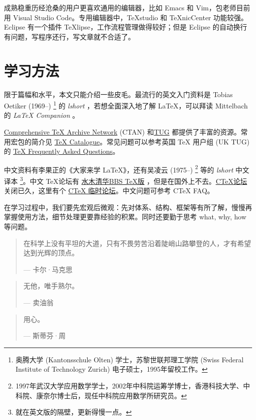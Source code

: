 成熟稳重历经沧桑的用户更喜欢通用的编辑器，比如 Emacs 和 Vim，包老师目前用 Visual Studio Code。专用编辑器中，TeXstudio 和 TeXnicCenter 功能较强。Eclipse 有一个插件 TeXlipse，工作流程管理做得较好；但是 Eclipse 的自动换行有问题，写程序还行，写文章就不合适了。

\section{学习方法}

限于篇幅和水平，本文只能介绍一些皮毛。最流行的英文入门资料是 Tobias Oetiker (1969--)\indexOetiker{} \footnote{奥腾大学 (Kantonsschule Olten) 学士，苏黎世联邦理工学院 (Swiss Federal Institute of Technology Zurich) 电子硕士，1995年留校工作。} 的 \emph{lshort} \citep{Oetiker_lshort}，若想全面深入地了解 \LaTeX ，可以拜读 Mittelbach 的 \emph{\LaTeX{} Companion} \citep{Mittelbach_latex_comp}。

\href{http://www.ctan.org/}{Comprehensive TeX Archive Network} (CTAN) 和\href{http://www.tug.org/}{TUG} 都提供了丰富的资源。常用宏包的简介见 \href{http://www.ctan.org/tex-archive/help/Catalogue/catalogue.html}{TeX Catalogue}。常见问题可以参考英国 TeX 用户组 (UK TUG) 的 \href{http://www.tex.ac.uk/faq/}{TeX Frequently Asked Questions}。

中文资料有李果正\indexLee 的《大家来学 \LaTeX 》\citep{Lee_latex}，还有吴凌云 (1975--)\indexWuLingyun{} \footnote{1997年武汉大学应用数学学士，2002年中科院运筹学博士，香港科技大学、中科院、康奈尔博士后，现任中科院应用数学所研究员。} 等的 \emph{lshort} 中文译本 \footnote{就在英文版的隔壁，更新得慢一点。}。中文 \TeX 论坛有 \href{http://www.smth.org/bbsdoc.php?board=TeX}{水木清华BBS TeX版} ，但是在国外上不去。\href{http://bbs.ctex.org/}{CTeX论坛} 关闭已久，这里有个 \href{https://github.com/CTeX-org/forum}{CTeX 临时论坛}。中文问题可参考 CTeX FAQ\citep{CTeX_faq}。

在学习过程中，我们要先宏观后微观：先对体系、结构、框架等有所了解，慢慢再掌握使用方法，细节处理更要靠经验的积累。同时还要勤于思考 what, why, how 等问题。

\begin{quotation}
在科学上没有平坦的大道，只有不畏劳苦沿着陡峭山路攀登的人，才有希望达到光辉的顶点。
\begin{flushright}
--- 卡尔·马克思
\end{flushright}
\end{quotation}

\begin{quotation}
无他，唯手熟尔。
\begin{flushright}
--- 卖油翁
\end{flushright}
\end{quotation}

\begin{quotation}
用心。
\begin{flushright}
--- 斯蒂芬·周
\end{flushright}
\end{quotation}



